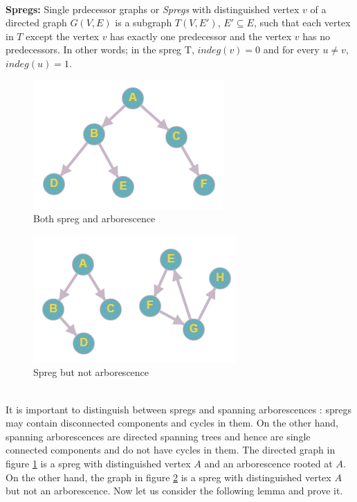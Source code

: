 \noindent\\
\begin{definition}\textbf{Spregs:} Single prdecessor graphs or \textit{Spregs} with distinguished vertex $v$ of a directed graph $G(V,E)$ is a subgraph $T(V,E')$, $E' \subseteq E$, such that each vertex in $T$ except the vertex $v$ has exactly one predecessor and the vertex $v$ has no predecessors. In other words; in the spreg T, $indeg(v) = 0$ and for every $u \neq v$, $indeg(u)=1$.\\
\end{definition}
\begin{figure}[h]
    \centering
    \includegraphics[scale = 0.5]{images/Spreg1.png}
    \caption{Both spreg and arborescence}
    \label{Fig:Spreg1}
\end{figure}
\begin{figure}[h]
    \centering
    \includegraphics[scale = 0.6]{images/Spreg2.png}
    \caption{Spreg but not arborescence}
    \label{Fig:Spreg2}
\end{figure}
\noindent\\
It is important to distinguish between spregs and spanning arborescences : spregs may contain disconnected components and cycles in them. On the other hand, spanning arborescences are directed spanning trees and hence are single connected components and do not have cycles in them. The directed graph in figure \ref{Fig:Spreg1} is a spreg with distinguished vertex $A$ and an arborescence rooted at $A$. On the other hand, the graph in figure \ref{Fig:Spreg2} is a spreg with distinguished vertex $A$ but not an arborescence. Now let us consider the following lemma and prove it.
